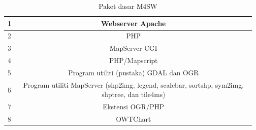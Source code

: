 \begin{table}[h]
\caption{Paket dasar M4SW}
\centering
\begin{tabular}{cc}
\hline
1&Webserver Apache\\
\hline
2&PHP\\
\hline
3&MapServer CGI\\
\hline
4&PHP/Mapscript\\
\hline
5&Program utiliti (pustaka) GDAL dan OGR\\
\hline
6&Program utiliti MapServer (shp2img, legend, scalebar, sortshp, sym2img, shptree, dan tile4ms)\\
\hline
7&Ekstensi OGR/PHP\\
\hline
8&OWTChart\\
\hline
\end{tabular}
\end{table}

